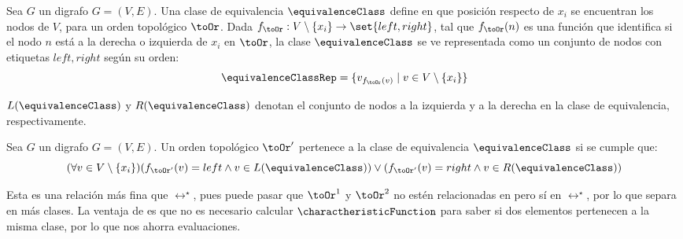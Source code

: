\begin{definition} \label{equivalenceClassDefinition}
	Sea $G$ un digrafo $G = (V, E)$. Una clase de equivalencia $\equivalenceClass$ define en que posición respecto de $x_i$ se encuentran los nodos de $V$, para un orden topológico $\toOr$. Dada $f_{\toOr}:V \setminus \{x_i\} \to \set{left, right}$, tal que $f_{\toOr}(n)$ es una función que identifica si el nodo $n$ está a la derecha o izquierda de $x_i$ en $\toOr$, la clase  $\equivalenceClass$ se ve representada como un conjunto de nodos con etiquetas $left, right$ según su orden:
	$$
	\equivalenceClassRep = \{ v_{f_{\toOr}(v)} \mid v \in V \setminus \{x_i\} \}
	$$
	
	
	$L(\equivalenceClass)$ y $R(\equivalenceClass)$ denotan el conjunto de nodos a la izquierda y a la derecha en la clase de equivalencia, respectivamente.
\end{definition}

\begin{definition}
	Sea $G$ un digrafo $G = (V, E)$. Un orden topológico $\toOr'$ pertenece a la clase de equivalencia $\equivalenceClass$ si se cumple que: %
	$$
	(\forall v \in V \setminus \{x_i\}) (f_{\toOr'}(v) = left \land v \in L(\equivalenceClass) ) \lor (f_{\toOr'}(v) = right \land v \in R(\equivalenceClass) )
	$$
\end{definition}


Esta es una relación más fina que $\rel^\star$, pues puede pasar que $\toOr^1$ y $\toOr^2$ no estén relacionadas en \rel{} pero sí en $\rel^\star$, por lo que separa en más clases. La ventaja de \rel{} es que no es necesario calcular $\charactheristicFunction$ para saber si dos elementos pertenecen a la misma clase, por lo que nos ahorra evaluaciones. 

